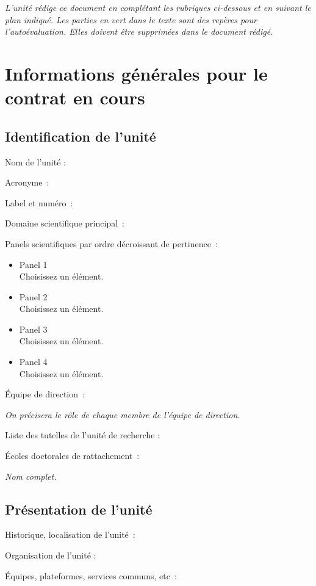 \documentclass[]{article}
\providecommand{\tightlist}{%
  \setlength{\itemsep}{0pt}\setlength{\parskip}{0pt}}
\newcommand{\instructions}[1]{{\em \color{hceresgreen}#1}}
\begin{document}
\instructions{L’unité rédige ce document en complétant les rubriques ci-dessous et en suivant le plan indiqué. Les parties en vert dans le texte sont des repères pour l’autoévaluation. Elles doivent être supprimées dans le document rédigé.}

\section{Informations générales pour le contrat en cours}

\subsection{Identification de l'unité}

Nom de l'unité :

Acronyme~:

Label et numéro~:

Domaine scientifique principal~:

Panels scientifiques par ordre décroissant de pertinence~:

\begin{itemize}
\tightlist
\item
  Panel 1\\
  Choisissez un élément.
\item
  Panel 2\\
  Choisissez un élément.
\item
  Panel 3\\
  Choisissez un élément.
\item
  Panel 4\\
  Choisissez un élément.
\end{itemize}

Équipe de direction~:

\instructions{On précisera le rôle de chaque membre de l’équipe de direction.}

Liste des tutelles de l'unité de recherche :

Écoles doctorales de rattachement~:

\instructions{Nom complet.}

\subsection{Présentation de l'unité}

Historique, localisation de l'unité~:

Organisation de l'unité :

Équipes, plateformes, services communs, etc~:
\end{document}
